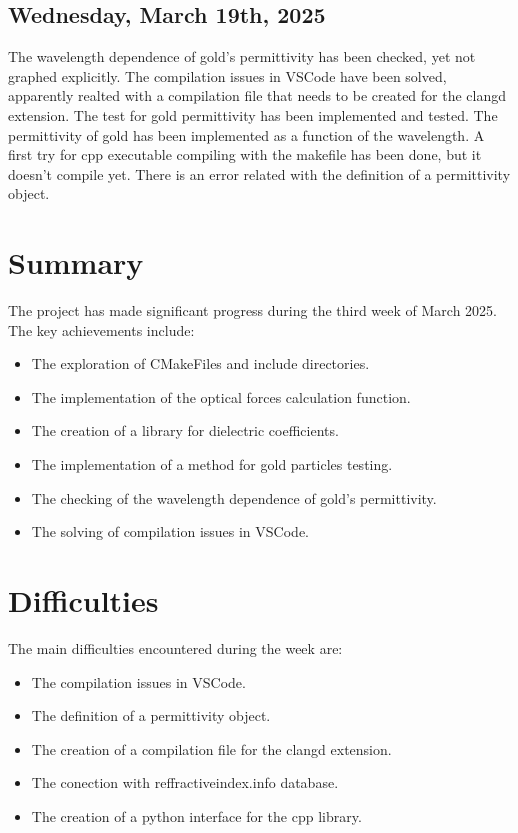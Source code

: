 \documentclass[12pt]{article}
\begin{document}
\subsection{Wednesday, March 19th, 2025}
The wavelength dependence of gold's permittivity has been
checked, yet not graphed explicitly. The compilation issues
in VSCode have been solved, apparently realted with a
compilation file that needs to be created for the clangd
extension. The test for gold permittivity has been
implemented and tested. The permittivity of gold has been
implemented as a function of the wavelength. A first try
for cpp executable compiling with the makefile has been
done, but it doesn't compile yet. There is an error
related with the definition of a permittivity object.

\section{Summary}
The project has made significant progress during the
third week of March 2025. The key achievements include:
\begin{itemize}
    \item The exploration of CMakeFiles and include directories.
    \item The implementation of the optical forces calculation function.
    \item The creation of a library for dielectric coefficients.
    \item The implementation of a method for gold particles testing.
    \item The checking of the wavelength dependence of gold's permittivity.
    \item The solving of compilation issues in VSCode.
\end{itemize}

\section{Difficulties}
The main difficulties encountered during the week are:
\begin{itemize}
    \item The compilation issues in VSCode.
    \item The definition of a permittivity object.
    \item The creation of a compilation file for the clangd extension.
    \item The conection with reffractiveindex.info database.
    \item The creation of a python interface for the cpp library.
\end{itemize}
\end{document}
